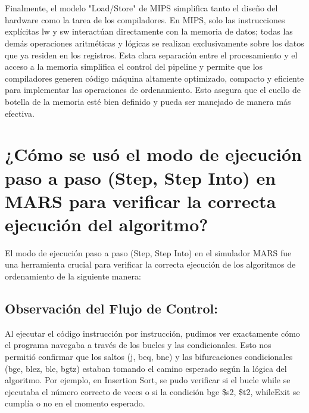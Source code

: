 \documentclass{article}
\begin{document}
\\
\\Finalmente, el modelo "Load/Store" de MIPS simplifica tanto el diseño del hardware como la tarea de los compiladores. En MIPS, solo las instrucciones explícitas lw y sw interactúan directamente con la memoria de datos; todas las demás operaciones aritméticas y lógicas se realizan exclusivamente sobre los datos que ya residen en los registros. Esta clara separación entre el procesamiento y el acceso a la memoria simplifica el control del pipeline y permite que los compiladores generen código máquina altamente optimizado, compacto y eficiente para implementar las operaciones de ordenamiento. Esto asegura que el cuello de botella de la memoria esté bien definido y pueda ser manejado de manera más efectiva.

\section{¿Cómo se usó el modo de ejecución paso a paso (Step, Step Into) en MARS para verificar la correcta ejecución del algoritmo?}
El modo de ejecución paso a paso (Step, Step Into) en el simulador MARS fue una herramienta crucial para verificar la correcta ejecución de los algoritmos de ordenamiento de la siguiente manera:
\subsection{Observación del Flujo de Control: }
 Al ejecutar el código instrucción por instrucción, pudimos ver exactamente cómo el programa navegaba a través de los bucles y las condicionales. Esto nos permitió confirmar que los saltos (j, beq, bne) y las bifurcaciones condicionales (bge, blez, ble, bgtz) estaban tomando el camino esperado según la lógica del algoritmo. Por ejemplo, en Insertion Sort, se pudo verificar si el bucle while se ejecutaba el número correcto de veces o si la condición bge \$s2, \$t2, whileExit se cumplía o no en el momento esperado.
\end{document}
